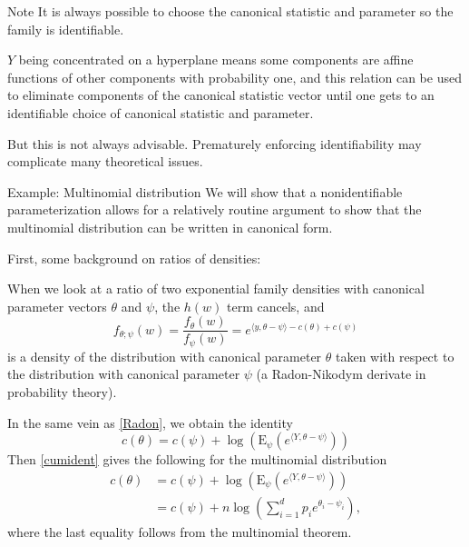 \documentclass[
  ignorenonframetext,
]{beamer}
\begin{document}
\begin{frame}{Note}
\protect\hypertarget{note}{}
It is always possible to choose the canonical statistic and parameter so
the family is identifiable.

\(Y\) being concentrated on a hyperplane means some components are
affine functions of other components with probability one, and this
relation can be used to eliminate components of the canonical statistic
vector until one gets to an identifiable choice of canonical statistic
and parameter.

But this is not always advisable. Prematurely enforcing identifiability
may complicate many theoretical issues.
\end{frame}

\begin{frame}{Example: Multinomial distribution}
\protect\hypertarget{example-multinomial-distribution}{}
We will show that a nonidentifiable parameterization allows for a
relatively routine argument to show that the multinomial distribution
can be written in canonical form.

First, some background on ratios of densities:

When we look at a ratio of two exponential family densities with
canonical parameter vectors \(\theta\) and \(\psi\), the \(h(w)\) term
cancels, and \begin{equation} \label{Radon}
    f_{\theta;\psi}(w) = \frac{f_{\theta}(w)}{f_{\psi}(w)} = e^{\langle y,\theta - \psi\rangle - c(\theta) + c(\psi)}   
\end{equation} is a density of the distribution with canonical parameter
\(\theta\) taken with respect to the distribution with canonical
parameter \(\psi\) (a Radon-Nikodym derivate in probability theory).
\end{frame}

\begin{frame}{}
\protect\hypertarget{section-5}{}
In the same vein as \eqref{Radon}, we obtain the identity
\begin{equation} \label{cumident}
    c(\theta) = c(\psi) + \log\left(\mathrm{E}_{\psi}\left(e^{\langle Y, \theta - \psi \rangle}\right)\right)
\end{equation} Then \eqref{cumident} gives the following for the
multinomial distribution \begin{align*}
  c(\theta) &= c(\psi) + \log\left(\mathrm{E}_{\psi}\left(e^{\langle Y, \theta - \psi \rangle}\right)\right) \\
  &= c(\psi) + n\log\left(\sum_{i=1}^d p_ie^{\theta_i - \psi_i}\right),
\end{align*} where the last equality follows from the multinomial
theorem.
\end{frame}
\end{document}
